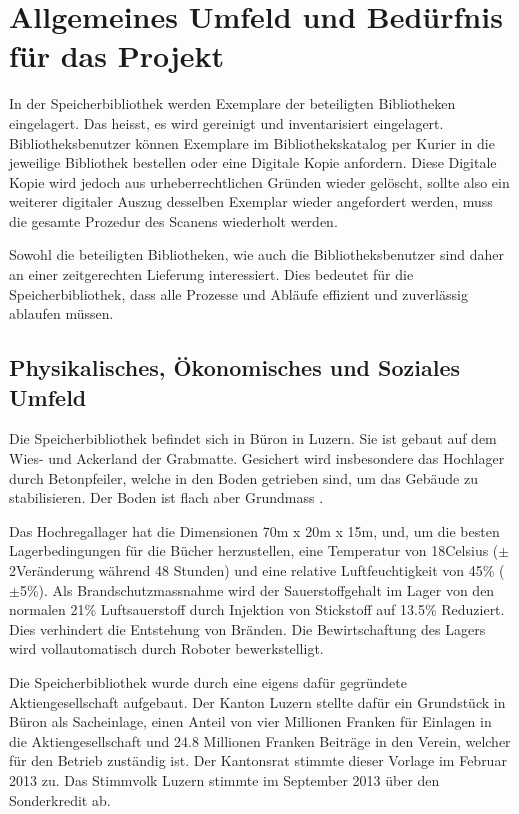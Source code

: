 \chapter{Allgemeines Umfeld und Bedürfnis für das Projekt}
In der Speicherbibliothek werden Exemplare der beteiligten Bibliotheken eingelagert. Das heisst, es wird gereinigt und inventarisiert eingelagert. Bibliotheksbenutzer können Exemplare im Bibliothekskatalog per Kurier in die jeweilige Bibliothek bestellen oder eine Digitale Kopie anfordern. Diese Digitale Kopie wird jedoch aus urheberrechtlichen Gründen wieder gelöscht, sollte also ein weiterer digitaler Auszug desselben Exemplar wieder angefordert werden, muss die gesamte Prozedur des Scanens wiederholt werden.

Sowohl die beteiligten Bibliotheken, wie auch die Bibliotheksbenutzer sind daher an einer zeitgerechten Lieferung interessiert. Dies bedeutet für die Speicherbibliothek, dass alle Prozesse und Abläufe effizient und zuverlässig ablaufen müssen.

\section{Physikalisches, Ökonomisches und Soziales Umfeld}
Die Speicherbibliothek befindet sich in Büron in Luzern. Sie ist gebaut auf dem Wies- und Ackerland der Grabmatte. Gesichert wird insbesondere das Hochlager durch Betonpfeiler, welche in den Boden getrieben sind, um das Gebäude zu stabilisieren. Der Boden ist flach aber Grundmass \parencite{MapGeoAdmin2019}.

Das Hochregallager hat die Dimensionen 70m x 20m x 15m, und, um die besten Lagerbedingungen für die Bücher herzustellen, eine Temperatur von 18\SIUnitSymbolDegree Celsius ($\pm$ 2\SIUnitSymbolDegree Veränderung während 48 Stunden) und eine relative Luftfeuchtigkeit von 45\% ($\pm$5\%). Als Brandschutzmassnahme wird der Sauerstoffgehalt im Lager von den normalen 21\% Luftsauerstoff durch Injektion von Stickstoff auf 13.5\% Reduziert. Dies verhindert die Entstehung von Bränden.
Die Bewirtschaftung des Lagers wird vollautomatisch durch Roboter bewerkstelligt.

Die Speicherbibliothek wurde durch eine eigens dafür gegründete Aktiengesellschaft aufgebaut. Der Kanton Luzern stellte dafür ein Grundstück in Büron als Sacheinlage, einen Anteil von vier Millionen Franken für Einlagen in die Aktiengesellschaft und 24.8 Millionen Franken Beiträge in den Verein, welcher für den Betrieb zuständig ist. Der Kantonsrat stimmte dieser Vorlage im Februar 2013 zu. Das Stimmvolk Luzern stimmte im September 2013 über den Sonderkredit ab.

